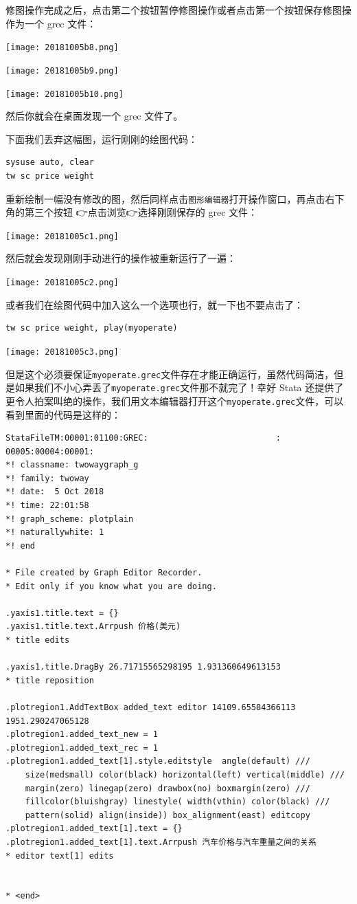 \documentclass[cn,fancy,blue,11pt]{elegantbook}
\begin{document}
修图操作完成之后，点击第二个按钮暂停修图操作或者点击第一个按钮保存修图操作为一个 grec 文件：

\noindent\texttt{[image: 20181005b8.png]}

\noindent\texttt{[image: 20181005b9.png]}

\texttt{[image: 20181005b10.png]}

然后你就会在桌面发现一个 grec 文件了。

下面我们丢弃这幅图，运行刚刚的绘图代码：

\begin{lstlisting}
sysuse auto, clear
tw sc price weight
\end{lstlisting}

重新绘制一幅没有修改的图，然后同样点击\lstinline{图形编辑器}打开操作窗口，再点击右下角的第三个按钮 👉点击浏览👉选择刚刚保存的 grec 文件：

\texttt{[image: 20181005c1.png]}

然后就会发现刚刚手动进行的操作被重新运行了一遍：

\texttt{[image: 20181005c2.png]}

或者我们在绘图代码中加入这么一个选项也行，就一下也不要点击了：

\begin{lstlisting}
tw sc price weight, play(myoperate)
\end{lstlisting}

\noindent\texttt{[image: 20181005c3.png]}

但是这个必须要保证\lstinline{myoperate.grec}文件存在才能正确运行，虽然代码简洁，但是如果我们不小心弄丢了\lstinline{myoperate.grec}文件那不就完了！幸好 Stata 还提供了更令人拍案叫绝的操作，我们用文本编辑器打开这个\lstinline{myoperate.grec}文件，可以看到里面的代码是这样的：

\begin{lstlisting}
StataFileTM:00001:01100:GREC:                          :
00005:00004:00001:
*! classname: twowaygraph_g
*! family: twoway
*! date:  5 Oct 2018
*! time: 22:01:58
*! graph_scheme: plotplain
*! naturallywhite: 1
*! end

* File created by Graph Editor Recorder.
* Edit only if you know what you are doing.

.yaxis1.title.text = {}
.yaxis1.title.text.Arrpush 价格(美元)
* title edits

.yaxis1.title.DragBy 26.71715565298195 1.931360649613153
* title reposition

.plotregion1.AddTextBox added_text editor 14109.65584366113 1951.290247065128
.plotregion1.added_text_new = 1
.plotregion1.added_text_rec = 1
.plotregion1.added_text[1].style.editstyle  angle(default) ///
    size(medsmall) color(black) horizontal(left) vertical(middle) ///
    margin(zero) linegap(zero) drawbox(no) boxmargin(zero) ///
    fillcolor(bluishgray) linestyle( width(vthin) color(black) ///
    pattern(solid) align(inside)) box_alignment(east) editcopy
.plotregion1.added_text[1].text = {}
.plotregion1.added_text[1].text.Arrpush 汽车价格与汽车重量之间的关系
* editor text[1] edits


* <end>
\end{lstlisting}
\end{document}
